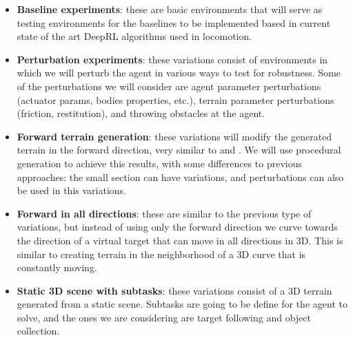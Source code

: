 \begin{itemize}
    \item \textbf{Baseline experiments}: these are basic environments that will serve
          as testing environments for the baselines to be implemented based in current
          state of the art DeepRL algorithms used in locomotion.

        \figTerrainParameterizationZero

    \item \textbf{Perturbation experiments}: these variations consist of environments
        in which we will perturb the agent in various ways to test for robustness. Some
        of the perturbations we will consider are agent parameter perturbations (actuator
        params, bodies properties, etc.), terrain parameter perturbations (friction,
        restitution), and throwing obstacles at the agent.

        \figTerrainParameterizationOne

    \item \textbf{Forward terrain generation}: these variations will modify the generated
        terrain in the forward direction, very similar to \citeauthor{DeepmindEmergenceLocomotion}
        and \citeauthor{DeepTerrainRL}. We will use procedural generation to achieve this
        results, with some differences to previous approaches: the small section can have
        variations, and perturbations can also be used in this variations.

        \figTerrainParameterizationTwo

    \item \textbf{Forward in all directions}: these are similar to the previous type of 
        variations, but instead of using only the forward direction we curve towards the direction
        of a virtual target that can move in all directions in 3D. This is similar to
        creating terrain in the neighborhood of a 3D curve that is constantly moving.

        \figTerrainParameterizationThree

    \item \textbf{Static 3D scene with subtasks}: these variations consist of a 3D terrain
        generated from a static scene. Subtasks are going to be define for the agent to solve,
        and the ones we are considering are target following and object collection.

        \figTerrainParameterizationFour
\end{itemize}

